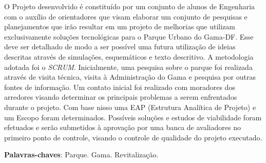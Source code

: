 \begin{resumo}
O Projeto desenvolvido \'e constitu\'ido por um conjunto de alunos de Engenharia com o aux\'ilio de orientadores que visam elaborar um conjunto de pesquisas e planejamentos que ir\~ao resultar em um projeto de melhorias que utilizam exclusivamente solu\c{c}\~oes tecnol\'ogicas para o Parque Urbano do Gama-DF. Esse deve ser detalhado de modo a ser poss\'ivel uma futura utiliza\c{c}\~ao de ideias descritas atrav\'es de simula\c{c}\~oes, esquem\'aticos e texto descritivo. A metodologia adotada foi o \textit{SCRUM}. Inicialmente, uma pesquisa sobre o parque foi realizada atrav\'es de visita t\'ecnica, visita \`a Administra\c{c}\~ao do Gama e pesquisa por outras fontes de informa\c{c}\~ao.  Um contato inicial foi realizado com moradores dos arredores visando determinar os principais problemas a serem enfrentados durante o projeto. Com base nisso uma EAP (Estrutura Anal\'itica de Projeto) e um Escopo foram determinados. Poss\'iveis solu\c{c}\~oes e estudos de viabilidade foram efetuados e ser\~ao submetidos \`a aprova\c{c}\~ao por uma banca de avaliadores no primeiro ponto de controle, visando o controle de qualidade do projeto executado.

 \vspace{\onelineskip}
    
 \noindent
 \textbf{Palavras-chaves}: Parque. Gama. Revitaliza\c{c}\~ao.
\end{resumo}
